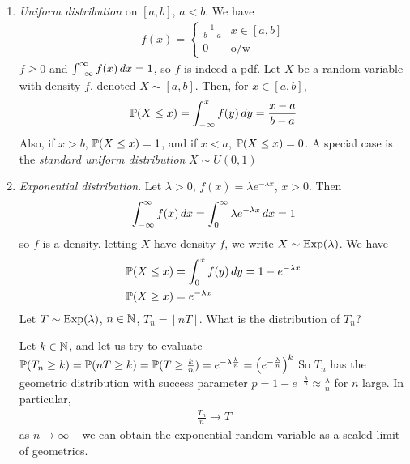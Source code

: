 \documentclass{../../template/note}
\begin{document}
    \begin{enumerate}[label=\protect\circled{\arabic*}]
        \item \emph{Uniform distribution} on \([a, b]\), \(a < b\). We have
        \begin{align*}
            f(x) = \begin{cases}
                \frac 1{b-a} & x \in [a, b] \\
                0 & \text{o/w}
            \end{cases}
        \end{align*}
        \(f \geq 0\) and \(\int_{-\infty}^\infty f(x) \,d{x} = 1\), so \(f\) is indeed a pdf. Let \(X\) be a random variable with density \(f\), denoted \(X \sim [a, b]\). Then, for \(x \in [a, b]\),
        \begin{align*}
            \mathbb P(X \leq x) = \int_{-\infty}^x f(y) \,d{y} = \frac{x-a}{b-a}
        \end{align*}
        Also, if \(x>b\), \(\mathbb P(X \leq x) = 1\), and if \(x < a\), \(\mathbb P(X \leq x) = 0\). A special case is the \emph{standard uniform distribution} \(X \sim U(0, 1)\)
        \item \emph{Exponential distribution}. Let \(\lambda > 0\), \(f(x) = \lambda e^{-\lambda x}\), \(x > 0\). Then
        \begin{align*}
            \int_{-\infty}^\infty f(x) \,d{x} = \int_0^\infty \lambda e^{-\lambda x} \,d{x} = 1
        \end{align*}
        so \(f\) is a density. letting \(X\) have density \(f\), we write \(X \sim \operatorname{Exp}(\lambda)\). We have
        \begin{align*}
            \mathbb P(X \leq x) &= \int_0^x f(y) \,d{y} = 1 - e^{-\lambda x} \\
            \mathbb P(X \geq x) &= e^{-\lambda x}
        \end{align*}
        Let \(T \sim \operatorname{Exp}(\lambda)\), \(n \in \mathbb N\), \(T_n = \left\lfloor nT \right\rfloor\). What is the distribution of \(T_n\)?

        Let \(k \in \mathbb N\), and let us try to evaluate \(\mathbb P(T_n \geq k) = \mathbb P(nT \geq k) = \mathbb P(T \geq \frac k n) = e^{-\lambda \frac k n} = \left(e^{-\frac{\lambda}n}\right)^k\)
        So \(T_n\) has the geometric distribution with success parameter \(p = 1 - e^{-\frac{\lambda}n} \approx \frac{\lambda} n\) for \(n\) large. In particular,
        \begin{align*}
            \frac{T_n} n \to T
        \end{align*}
        as \(n \to \infty\) -- we can obtain the exponential random variable as a scaled limit of geometrics.
        

\end{enumerate}
\end{document}
